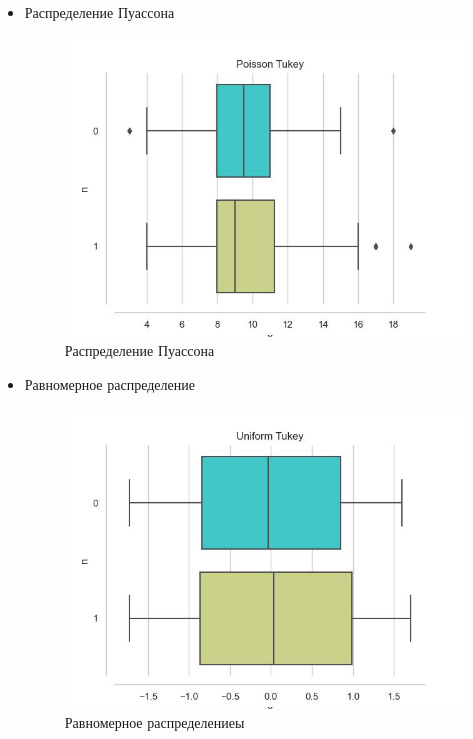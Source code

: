\begin{itemize}
	\item{Распределение Пуассона}
	\begin{figure}[H]
		\begin{center}
			\includegraphics[scale=0.75]{task_3/resource/Poisson Tukey.jpg}
			\caption{Распределение Пуассона} 
		\end{center}
	\end{figure}
	
	\item{Равномерное распределение}
	\begin{figure}[H]
		\begin{center}
			\includegraphics[scale=0.75]{task_3/resource/Uniform Tukey.jpg}
			\caption{Равномерное распределениеы} 
		\end{center}
	\end{figure}

\end{itemize}

